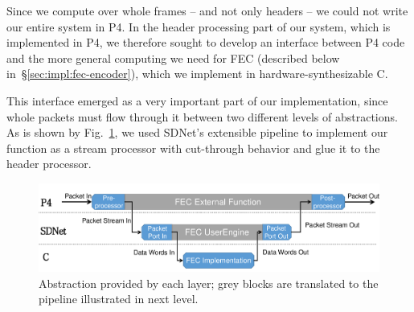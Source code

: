 %
%

         
Since we compute over whole frames -- and not only headers -- we could
not write our entire system in P4. In the header processing part of
our system, which is implemented in P4, we therefore sought to develop
an interface between P4 code and the more general computing we need
for FEC (described below in~\S\ref{sec:impl:fec-encoder}), which we
implement in hardware-synthesizable C.

This interface emerged as a very important part of our implementation,
since whole packets must flow through it between two different levels
of abstractions.
As is shown by Fig.~\ref{fig:sdnet-interface}, we used SDNet's extensible pipeline to implement
our function as a stream processor with cut-through behavior and glue it
to the header processor.

\begin{figure}
  \centering
  \includegraphics[width=0.4\paperwidth]{figures/sdnet-interface.png}
  \caption{\label{fig:sdnet-interface}Abstraction provided by each layer; grey blocks are translated to the pipeline illustrated in next level.}
\end{figure}


